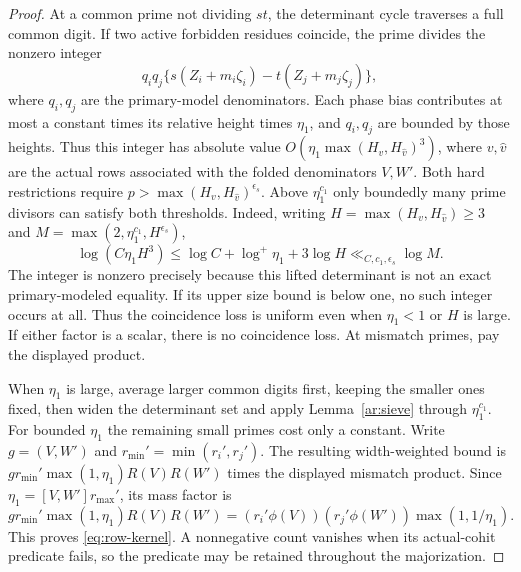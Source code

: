 \begin{proof}
At a common prime not dividing $st$, the determinant cycle traverses a
full common digit. If two active forbidden residues coincide, the prime
divides the nonzero integer
\[
 q_iq_j\bigl\{s(Z_i+m_i\zeta_i)
                 -t(Z_j+m_j\zeta_j)\bigr\},
\]
where $q_i,q_j$ are the primary-model denominators. Each phase bias
contributes at most a constant times its relative height times
$\eta_1$, and $q_i,q_j$ are bounded by those heights. Thus this integer
has absolute value
$O(\eta_1\max(H_v,H_{\widehat v})^3)$, where $v,\widehat v$ are the
actual rows associated with the folded denominators $V,W'$.
Both hard restrictions require
$p>\max(H_v,H_{\widehat v})^{\epsilon_s}$. Above
$\eta_1^{c_1}$ only boundedly many prime divisors can satisfy both
thresholds. Indeed, writing $H=\max(H_v,H_{\widehat v})\ge3$ and
$M=\max(2,\eta_1^{c_1},H^{\epsilon_s})$,
\[
 \log(C\eta_1H^3)
 \le \log C+\log^+\eta_1+3\log H
 \ll_{C,c_1,\epsilon_s}\log M.
\]
The integer is nonzero precisely because this lifted determinant is not
an exact primary-modeled equality. If its upper size bound is below
one, no such integer occurs at all. Thus the coincidence loss is
uniform even when $\eta_1<1$ or $H$ is large. If either factor is
a scalar, there is no coincidence loss. At mismatch primes, pay the
displayed product.

When $\eta_1$ is large, average larger common digits first, keeping the
smaller ones fixed, then widen the determinant set and apply
Lemma~\ref{ar:sieve} through $\eta_1^{c_1}$. For bounded $\eta_1$ the
remaining small primes cost only a constant. Write $g=(V,W')$ and
$r_{\min}'=\min(r_i',r_j')$. The resulting width-weighted bound is
$g r_{\min}'\max(1,\eta_1)R(V)R(W')$ times the displayed mismatch
product. Since $\eta_1=[V,W']r_{\max}'$, its mass factor is
\[
 g r_{\min}'\max(1,\eta_1)R(V)R(W')
 =(r_i'\phi(V))(r_j'\phi(W'))\max(1,1/\eta_1).
\]
This proves \eqref{eq:row-kernel}. A nonnegative count vanishes when its actual-cohit
predicate fails, so the predicate may be retained throughout the
majorization.
\end{proof}

